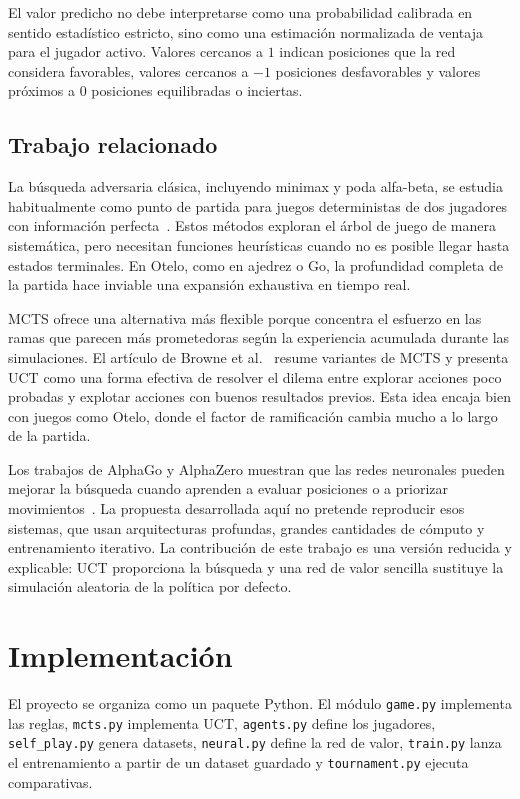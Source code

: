 \documentclass[conference,a4paper]{IEEEtran}
\begin{document}
El valor predicho no debe interpretarse como una probabilidad calibrada en
sentido estadístico estricto, sino como una estimación normalizada de ventaja
para el jugador activo. Valores cercanos a \(1\) indican posiciones que la red
considera favorables, valores cercanos a \(-1\) posiciones desfavorables y
valores próximos a \(0\) posiciones equilibradas o inciertas.

\subsection{Trabajo relacionado}

La búsqueda adversaria clásica, incluyendo minimax y poda alfa-beta, se estudia
habitualmente como punto de partida para juegos deterministas de dos jugadores
con información perfecta~\cite{russell2020}. Estos métodos exploran el árbol de
juego de manera sistemática, pero necesitan funciones heurísticas cuando no es
posible llegar hasta estados terminales. En Otelo, como en ajedrez o Go, la
profundidad completa de la partida hace inviable una expansión exhaustiva en
tiempo real.

MCTS ofrece una alternativa más flexible porque concentra el esfuerzo en las
ramas que parecen más prometedoras según la experiencia acumulada durante las
simulaciones. El artículo de Browne et al.~\cite{browne2012} resume variantes
de MCTS y presenta UCT como una forma efectiva de resolver el dilema entre
explorar acciones poco probadas y explotar acciones con buenos resultados
previos. Esta idea encaja bien con juegos como Otelo, donde el factor de
ramificación cambia mucho a lo largo de la partida.

Los trabajos de AlphaGo y AlphaZero muestran que las redes neuronales pueden
mejorar la búsqueda cuando aprenden a evaluar posiciones o a priorizar
movimientos~\cite{silver2016, silver2017}. La propuesta desarrollada aquí no
pretende reproducir esos sistemas, que usan arquitecturas profundas, grandes
cantidades de cómputo y entrenamiento iterativo. La contribución de este trabajo
es una versión reducida y explicable: UCT proporciona la búsqueda y una red de
valor sencilla sustituye la simulación aleatoria de la política por defecto.

\section{Implementación}

El proyecto se organiza como un paquete Python. El módulo \texttt{game.py}
implementa las reglas, \texttt{mcts.py} implementa UCT, \texttt{agents.py}
define los jugadores, \texttt{self\_play.py} genera datasets,
\texttt{neural.py} define la red de valor, \texttt{train.py} lanza el
entrenamiento a partir de un dataset guardado y \texttt{tournament.py} ejecuta
comparativas.
\end{document}
